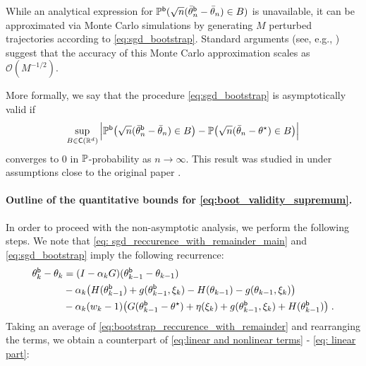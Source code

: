 \begin{remark}
While an analytical expression for \(\mathbb{P}^{\mathsf{b}}(\sqrt{n} (\bar{\theta}_{n}^{\mathsf{b}} - \bar{\theta}_n) \in B)\) is unavailable, it can be approximated via Monte Carlo simulations by generating \(M\) perturbed trajectories according to \eqref{eq:sgd_bootstrap}. Standard arguments (see, e.g., \cite[Section~5.1]{shao2003mathematical}) suggest that the accuracy of this Monte Carlo approximation scales as \(\mathcal{O}(M^{-1/2})\).
\end{remark}
\noindent More formally, we say that the procedure \eqref{eq:sgd_bootstrap} is asymptotically valid if 
\begin{equation}
\label{eq:boot_validity_supremum}
\sup_{B \in \mathsf{C}(\mathbb{R}^{d})} \Big| \mathbb{P}^{\mathsf{b}}\big(\sqrt{n} (\bar{\theta}_{n}^{\mathsf{b}} - \bar{\theta}_n) \in B \big) - \mathbb{P}\big(\sqrt{n} (\bar{\theta}_n - \theta^\star) \in B\big) \Big|
\end{equation}
converges to $0$ in $\mathbb{P}$-probability as $n \to \infty$. This result was studied in \cite{JMLR:v19:17-370} under assumptions close to the original paper \cite{polyak1992acceleration}.

\paragraph{Outline of the quantitative bounds for \eqref{eq:boot_validity_supremum}.} In order to proceed with the non-asymptotic analysis, we perform the following steps. We note that \eqref{eq: sgd_reccurence_with_remainder_main} and \eqref{eq:sgd_bootstrap} imply the following recurrence:
\begin{equation}
\label{eq:bootstrap_reccurence_with_remainder}
    \begin{split}
    \theta_{k}^{\mathsf{b}}-\theta_{k}  &= (I-\alpha_{k}G)(\theta_{k-1}^{\mathsf{b}}-\theta_{k-1}) \\
     &- \alpha_k\bigl(H(\theta_{k-1}^{\mathsf{b}}) +g(\theta_{k-1}^{\mathsf{b}}, \xi_k) -  H(\theta_{k-1}) -g(\theta_{k-1}, \xi_k)\bigr)\\&- \alpha_k(w_k-1)\bigl( G(\theta_{k-1}^{\mathsf{b}}-\theta^\star)+\eta(\xi_k) + g(\theta_{k-1}^{\mathsf{b}}, \xi_k) + H(\theta_{k-1}^{\mathsf{b}})\bigr)\;.   
    \end{split}
\end{equation}
Taking an average of \eqref{eq:bootstrap_reccurence_with_remainder} and rearranging the terms, we obtain a counterpart of \eqref{eq:linear and nonlinear terms} - \eqref{eq: linear part}:

